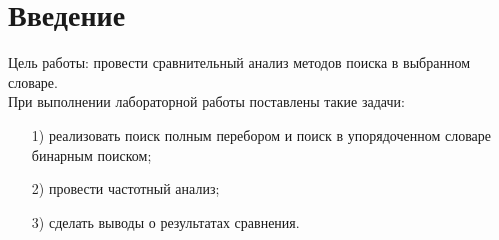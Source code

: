 \chapter*{Введение}
\label{cha:intro}
Цель работы: провести сравнительный анализ методов поиска в выбранном словаре.\\
При выполнении лабораторной работы поставлены такие задачи:
\begin{enumerate}
	\item[1)] реализовать поиск полным перебором и поиск в упорядоченном словаре бинарным поиском;
	\item[2)] провести частотный анализ;
	\item[3)] сделать выводы о результатах сравнения.
\end{enumerate}
